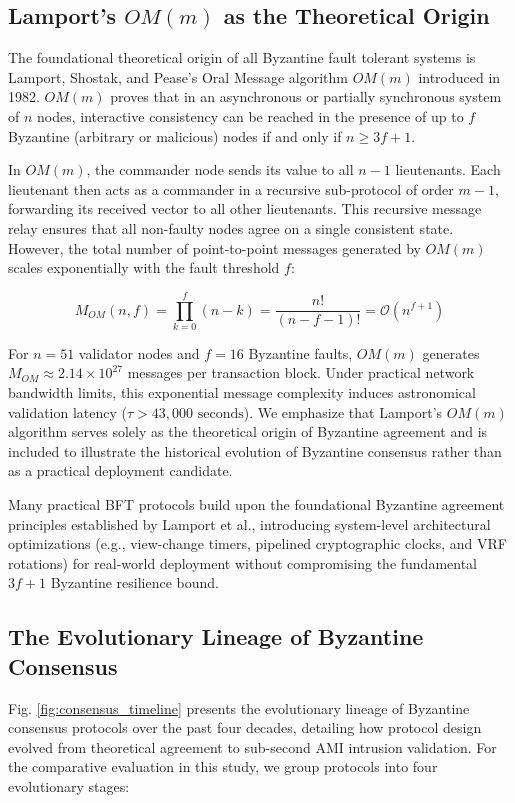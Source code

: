 \documentclass[10pt,twocolumn,journal]{IEEEtran}
\begin{document}
\subsection{Lamport's $OM(m)$ as the Theoretical Origin}
The foundational theoretical origin of all Byzantine fault tolerant systems is Lamport, Shostak, and Pease's Oral Message algorithm $OM(m)$ introduced in 1982. $OM(m)$ proves that in an asynchronous or partially synchronous system of $n$ nodes, interactive consistency can be reached in the presence of up to $f$ Byzantine (arbitrary or malicious) nodes if and only if $n \ge 3f + 1$.

In $OM(m)$, the commander node sends its value to all $n-1$ lieutenants. Each lieutenant then acts as a commander in a recursive sub-protocol of order $m-1$, forwarding its received vector to all other lieutenants. This recursive message relay ensures that all non-faulty nodes agree on a single consistent state. However, the total number of point-to-point messages generated by $OM(m)$ scales exponentially with the fault threshold $f$:

\begin{equation}
M_{OM}(n, f) = \prod_{k=0}^{f} (n - k) = \frac{n!}{(n - f - 1)!} = \mathcal{O}(n^{f+1})
\label{eq:om_complexity}
\end{equation}

For $n=51$ validator nodes and $f=16$ Byzantine faults, $OM(m)$ generates $M_{OM} \approx 2.14 \times 10^{27}$ messages per transaction block. Under practical network bandwidth limits, this exponential message complexity induces astronomical validation latency ($\tau > 43,000\text{ seconds}$). We emphasize that Lamport's $OM(m)$ algorithm serves solely as the theoretical origin of Byzantine agreement and is included to illustrate the historical evolution of Byzantine consensus rather than as a practical deployment candidate.

Many practical BFT protocols build upon the foundational Byzantine agreement principles established by Lamport et al., introducing system-level architectural optimizations (e.g., view-change timers, pipelined cryptographic clocks, and VRF rotations) for real-world deployment without compromising the fundamental $3f+1$ Byzantine resilience bound.

\subsection{The Evolutionary Lineage of Byzantine Consensus}
Fig. \ref{fig:consensus_timeline} presents the evolutionary lineage of Byzantine consensus protocols over the past four decades, detailing how protocol design evolved from theoretical agreement to sub-second AMI intrusion validation. For the comparative evaluation in this study, we group protocols into four evolutionary stages:
\end{document}
